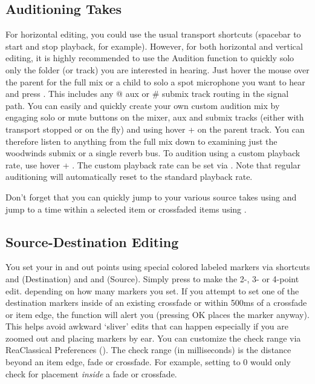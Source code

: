 \documentclass[10pt,american]{article}
\begin{document}
\subsection{Auditioning Takes}

For horizontal editing, you could use the usual transport shortcuts (spacebar to
start and stop playback, for example). However, for both horizontal and vertical
editing, it is highly recommended to use the Audition function to quickly solo
only the folder (or track) you are interested in hearing. Just hover the mouse
over the parent for the full mix or a child to solo a spot microphone you want
to hear and press  . This includes any @ aux or \# submix track routing
in the signal path. You can easily and quickly create your own custom audition
mix by engaging solo or mute buttons on the mixer, aux and submix tracks (either
with transport stopped or on the fly) and using hover +  on the parent
track. You can therefore listen to anything from the full mix down to examining
just the woodwinds submix or a single reverb bus. To audition using a custom
playback rate, use hover + . The custom playback rate can be set
via . Note that regular auditioning will automatically reset to the
standard playback rate. 

Don't forget that you can quickly jump to your various source takes using
\keys{\return} and jump to a time within a selected item or crossfaded items
using \keys{\tab} .

\subsection{Source-Destination Editing}

You set your in and out points using special colored labeled markers via
shortcuts  and  (Destination) and  and 
(Source). Simply press  to make the 2-, 3- or 4-point edit. depending on
how many markers you set. If you attempt to set one of the destination markers
inside of an existing crossfade or within 500ms of a crossfade or item edge, the
function will alert you (pressing OK places the marker anyway). This helps avoid
awkward `sliver' edits that can happen especially if you are zoomed out and
placing markers by ear. You can customize the check range via ReaClassical
Preferences (). The check range (in milliseconds) is the distance
beyond an item edge, fade or crossfade. For example, setting to 0 would only
check for placement \emph{inside }a fade or crossfade.
\end{document}
